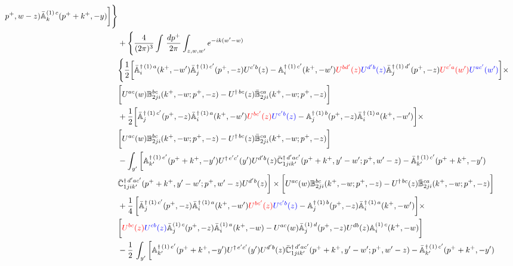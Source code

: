 \documentclass[aps,prd,amsmath,amssymb,nofootinbib]{revtex4-2}
\def\mf#1{\mathbb{#1}}
\numberwithin{equation}{section}
\begin{document}
\begin{align}
p^{+},w-z)\Bar{\mf{A}}^{(1)\,c}_{k}(p^{+}+k^{+},-y)\bigg] \Bigg\}\notag \\ & + \Bigg\{\frac{4}{(2\pi)^{3}} \int\, \frac{dp^{+}}{2\pi}\int_{z,w,w^{\prime}} e^{-ik(w^{\prime}-w)} \notag \\ & 
        \Bigg\{\frac{1}{2}\bigg[\Bar{\mf{A}}^{\dagger\, (1)\, a}_{i}(k^{+},-w^{\prime})\Bar{\mf{A}}^{\dagger\, (1)\, c^{\prime}}_{j}(p^{+},-z)U^{c^{\prime}b}(z)-\mf{A}^{\dagger\, (1)\, c^{\prime}}_{i}(k^{+},- w^{\prime})\textcolor{red}{U^{bd^{\prime}}(z)}\textcolor{blue}{U^{d^{\prime}b}(z)}\Bar{\mf{A}}^{\dagger\, (1)\, d^{\prime}}_{j}(p^{+},-z)\textcolor{red}{U^{c^{\prime}a}(w^{\prime})}\textcolor{blue}{U^{ac^{\prime}}(w^{\prime})}  \bigg]\times\notag \\ & \bigg[U^{ac}(w) \mf{B}^{bc}_{2ji}(k^{+},-w;p^{+},-z) -U^{\dagger\, bc}(z)\Bar{\mf{B}}^{ca}_{2ji}(k^{+},-w; p^{+},-z)\bigg]\notag \\ & +\frac{1}{2}\bigg[\Bar{\mf{A}}^{\dagger\,(1)\, c^{\prime}}_{j}(p^{+},-z)\Bar{\mf{A}}^{\dagger\, (1)\, a}_{i}(k^{+},- w^{\prime})\textcolor{red}{U^{bc^{\prime}}(z)}\textcolor{blue}{U^{c^{\prime}b}(z)} - \mf{A}^{\dagger\, (1)\, b}_{j}(p^{+},- z)\Bar{\mf{A}}^{\dagger\, (1)\, a}_{i}(k^{+},- w^{\prime})\bigg] \times \notag \\ & \bigg[U^{ac}(w) \mf{B}^{bc}_{2ji}(k^{+},-w;p^{+},-z) -U^{\dagger\, bc}(z)\Bar{\mf{B}}^{ca}_{2ji}(k^{+},-w; p^{+},-z)\bigg]\notag \\ & -\int_{y^{\prime}}\bigg[\mf{A}^{\dagger\, (1)\,e^{\prime}}_{k^{\prime}}(p^{+}+k^{+},-y^{\prime})U^{\dagger\, e^{\prime}c^{\prime}}(y^{\prime})U^{d^{\prime}b}(z) \Bar{\mf{C}}^{\dagger\, d^{\prime}ac^{\prime}}_{1jik^{\prime}}(p^{+}+k^{+},y^{\prime}-w^{\prime}; p^{+},w^{\prime}-z)  -\Bar{\mf{A}}^{\dagger\, (1)\,c^{\prime}}_{k^{\prime}}(p^{+}+k^{+},-y^{\prime})\notag \\ & \Bar{\mf{C}}^{\dagger\, d^{\prime}ac^{\prime}}_{1jik^{\prime}}(p^{+}+k^{+},y^{\prime}-w^{\prime}; p^{+},w^{\prime}-z)U^{d^{\prime}b}(z)\bigg] \times \bigg[U^{ac}(w) \mf{B}^{bc}_{2ji}(k^{+},-w;p^{+},-z) -U^{\dagger\, bc}(z)\Bar{\mf{B}}^{ca}_{2ji}(k^{+},-w; p^{+},-z)\bigg]\notag \\ & +\frac{1}{4}\,\bigg[\Bar{\mf{A}}^{\dagger\,(1)\, c^{\prime}}_{j}(p^{+},-z)\Bar{\mf{A}}^{\dagger\, (1)\, a}_{i}(k^{+},- w^{\prime})\textcolor{red}{U^{bc^{\prime}}(z)}\textcolor{blue}{U^{c^{\prime}b}(z)} - \mf{A}^{\dagger\, (1)\, b}_{j}(p^{+},- z)\Bar{\mf{A}}^{\dagger\, (1)\, a}_{i}(k^{+},- w^{\prime})\bigg]\times\notag \\ &  \bigg[\textcolor{red}{U^{bc}(z)}\textcolor{blue}{U^{cb}(z)}\Bar{\mf{A}}^{(1)\, c}_{j}(p^{+},-z)\Bar{\mf{A}}^{(1)\, a}_{i}(k^{+},-w)-U^{ac}(w) \Bar{\mf{A}}^{(1)\, d}_{j}(p^{+},-z)U^{db}(z) \mf{A}^{(1)\, c}_{i}(k^{+},- w)\bigg]\notag \\ & -\frac{1}{2}\, \int_{y^{\prime}}\bigg[\mf{A}^{\dagger\, (1)\,e^{\prime}}_{k^{\prime}}(p^{+}+k^{+},-y^{\prime})U^{\dagger\, e^{\prime}c^{\prime}}(y^{\prime})U^{d^{\prime}b}(z) \Bar{\mf{C}}^{\dagger\, d^{\prime}ac^{\prime}}_{1jik^{\prime}}(p^{+}+k^{+},y^{\prime}-w^{\prime}; p^{+},w^{\prime}-z)  -\Bar{\mf{A}}^{\dagger\, (1)\,c^{\prime}}_{k^{\prime}}(p^{+}+k^{+},-y^{\prime})\notag \\ 
\end{align}
\end{document}
